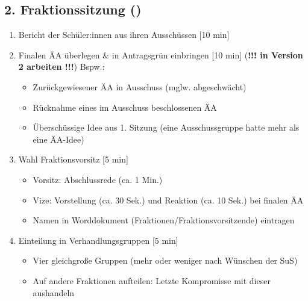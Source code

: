 \documentclass{article}
\begin{document}
	\subsection{2. Fraktionssitzung (\timeFrakTwo)}
	\begin{enumerate}
		\item Bericht der Schüler:innen aus ihren Ausschüssen [10 min]
		\item Finalen ÄA überlegen \& in Antragsgrün einbringen [10 min] \newline
		(\textbf{!!! in Version 2 arbeiten !!!}) \newline
		Bspw.:
		\begin{itemize}
			\item Zurückgewiesener ÄA in Ausschuss (mglw. abgeschwächt)
			\item Rücknahme eines im Ausschuss beschlossenen ÄA
			\item Überschüssige Idee aus 1. Sitzung \newline (eine Ausschussgruppe hatte mehr als eine ÄA-Idee)
		\end{itemize}
		
		\item Wahl Fraktionsvorsitz [5 min]
		\begin{itemize}
			\item Vorsitz: Abschlussrede (ca. 1 Min.)
			\item Vize: Vorstellung (ca. 30 Sek.) und Reaktion (ca. 10 Sek.) \newline bei finalen ÄA 
			\item Namen in Worddokument (Fraktionen/Fraktionsvorsitzende) \newline eintragen
		\end{itemize}
		\item Einteilung in Verhandlungsgruppen [5 min]
		\begin{itemize}
			\item Vier gleichgroße Gruppen (mehr oder weniger nach Wünschen der SuS)
			\item Auf andere Fraktionen aufteilen: Letzte Kompromisse mit dieser aushandeln
		\end{itemize}
	\end{enumerate}
	
\end{document}
